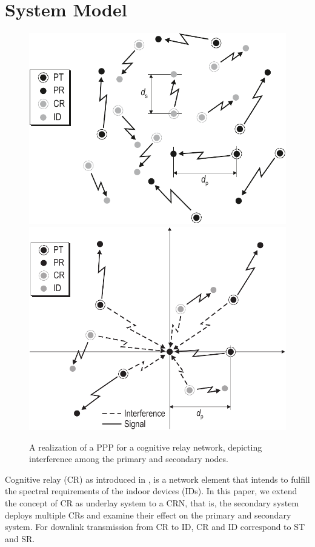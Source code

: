 \documentclass[conference, twocolumn]{IEEEtran}
\begin{document}
\section{System Model} \label{sec:sys mod}
\begin{figure}[!t]
        \centering
	\makeatletter
        \if@twocolumn
        \includegraphics[trim=0.0cm 0.0cm 0.0cm 0.0cm,clip=true,width= 0.85 \columnwidth]{figures/SGeometry}
        \else
        \includegraphics[trim=0.0cm 0.0cm 0.0cm 0.0cm,clip=true,width=0.5 \columnwidth]{figures/Interference_at_PR}
        \fi
	\makeatother
        \caption{A realization of a PPP for a cognitive relay network, depicting interference among the primary and secondary nodes.} %
	\label{fig:Int_Sc}
\end{figure}
Cognitive relay (CR) as introduced in \cite{Kaushik13, Kaushik14}, is a network element that intends to fulfill the spectral requirements of the indoor devices (IDs). 
In this paper, we extend the concept of CR as underlay system to a CRN, that is, the secondary system deploys multiple CRs and examine their effect on the primary and secondary system. For downlink transmission from CR to ID, CR and ID correspond to ST and SR. 
\end{document}
